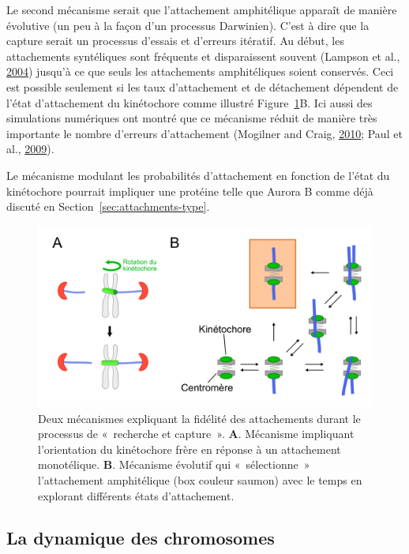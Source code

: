 \documentclass[12pt,a4paper,twoside,openright]{book}
\begin{document}
Le second mécanisme serait que l'attachement amphitélique apparaît de
manière évolutive (un peu à la façon d'un processus Darwinien). C'est à
dire que la capture serait un processus d'essais et d'erreurs itératif.
Au début, les attachements syntéliques sont fréquents et disparaissent
souvent (Lampson et al., \protect\hyperlink{ref-Lampson2004}{2004})
jusqu'à ce que seuls les attachements amphitéliques soient conservés.
Ceci est possible seulement si les taux d'attachement et de détachement
dépendent de l'état d'attachement du kinétochore comme illustré
Figure~\ref{fig:spindle_assembly}B. Ici aussi des simulations numériques
ont montré que ce mécanisme réduit de manière très importante le nombre
d'erreurs d'attachement (Mogilner and Craig,
\protect\hyperlink{ref-Mogilner2010}{2010}; Paul et al.,
\protect\hyperlink{ref-Paul2009}{2009}).

Le mécanisme modulant les probabilités d'attachement en fonction de
l'état du kinétochore pourrait impliquer une protéine telle que Aurora B
comme déjà discuté en Section~\ref{sec:attachments-type}.

\begin{figure}[htbp]
\centering
\includegraphics{figures/intro/spindle_assembly.png}
\caption[Deux mécanismes de l'assemblage du fuseau mitotique]{\label{fig:spindle_assembly}Deux
mécanismes expliquant la fidélité des attachements durant le processus
de «~recherche et capture~». \textbf{A}. Mécanisme impliquant
l'orientation du kinétochore frère en réponse à un attachement
monotélique. \textbf{B}. Mécanisme évolutif qui «~sélectionne~»
l'attachement amphitélique (box couleur saumon) avec le temps en
explorant différents états d'attachement.}
\end{figure}

\subsection{La dynamique des
chromosomes}\label{la-dynamique-des-chromosomes}
\end{document}
